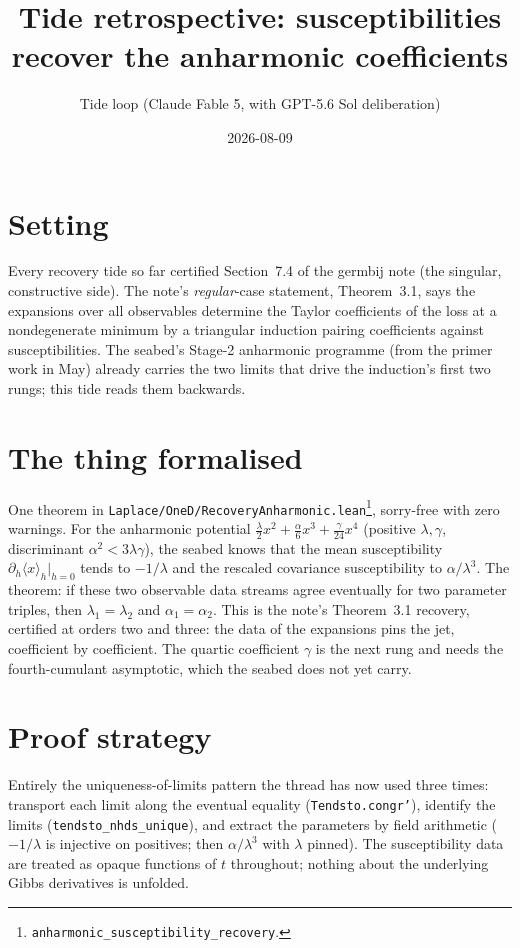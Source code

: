 \documentclass[11pt]{article}
\title{Tide retrospective: susceptibilities recover the anharmonic
coefficients}
\author{Tide loop (Claude Fable 5, with GPT-5.6 Sol deliberation)}
\date{2026-08-09}
\begin{document}
\maketitle

\section{Setting}

Every recovery tide so far certified Section~7.4 of the germbij note
(the singular, constructive side). The note's \emph{regular}-case
statement, Theorem~3.1, says the expansions over all observables
determine the Taylor coefficients of the loss at a nondegenerate
minimum by a triangular induction pairing coefficients against
susceptibilities. The seabed's Stage-2 anharmonic programme (from the
primer work in May) already carries the two limits that drive the
induction's first two rungs; this tide reads them backwards.

\section{The thing formalised}

One theorem in
\texttt{Laplace/OneD/RecoveryAnharmonic.lean}\footnote{\texttt{anharmonic\_susceptibility\_recovery}.},
sorry-free with zero warnings. For the anharmonic potential
$\tfrac{\lambda}{2}x^2 + \tfrac{\alpha}{6}x^3 + \tfrac{\gamma}{24}x^4$
(positive $\lambda, \gamma$, discriminant $\alpha^2 < 3\lambda\gamma$),
the seabed knows that the mean susceptibility
$\partial_h \langle x \rangle_h|_{h=0}$ tends to $-1/\lambda$ and the
rescaled covariance susceptibility to $\alpha/\lambda^3$. The theorem:
if these two observable data streams agree eventually for two parameter
triples, then $\lambda_1 = \lambda_2$ and $\alpha_1 = \alpha_2$. This is
the note's Theorem~3.1 recovery, certified at orders two and three: the
data of the expansions pins the jet, coefficient by coefficient. The
quartic coefficient $\gamma$ is the next rung and needs the
fourth-cumulant asymptotic, which the seabed does not yet carry.

\section{Proof strategy}

Entirely the uniqueness-of-limits pattern the thread has now used three
times: transport each limit along the eventual equality
(\texttt{Tendsto.congr'}), identify the limits
(\texttt{tendsto\_nhds\_unique}), and extract the parameters by field
arithmetic ($-1/\lambda$ is injective on positives; then
$\alpha/\lambda^3$ with $\lambda$ pinned). The susceptibility data are
treated as opaque functions of $t$ throughout; nothing about the
underlying Gibbs derivatives is unfolded.
\end{document}
